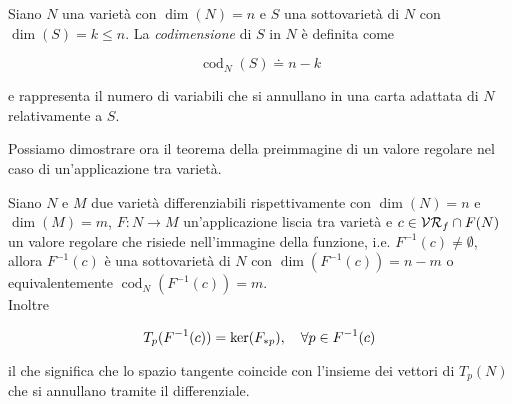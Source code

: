 \begin{definition}
	Siano $ N $ una varietà con $ \dim(N)=n $ e $ S $ una sottovarietà di $ N $ con $ \dim(S)=k \leqslant n $. La \textit{codimensione} di $ S $ in $ N $ è definita come
	
	\begin{equation}
		\operatorname{cod}_{N}(S) \doteq n-k
	\end{equation}

	e rappresenta il numero di variabili che si annullano in una carta adattata di $ N $ relativamente a $ S $.
\end{definition}

Possiamo dimostrare ora il teorema della preimmagine di un valore regolare nel caso di un'applicazione tra varietà.

\begin{theorem}\label{thm:preimg}
	Siano $ N $ e $ M $ due varietà differenziabili rispettivamente con $ \dim(N)=n $ e $ \dim(M)=m $, $ F : N \to M $ un'applicazione liscia tra varietà e $ c \in \mathcal{VR}_{f} \cap F(N) $ un valore regolare che risiede nell'immagine della funzione, i.e. $ F^{-1}(c) \neq \emptyset $, allora $ F^{-1}(c) $ è una sottovarietà di $ N $ con $ \dim(F^{-1}(c)) = n-m $ o equivalentemente $ \operatorname{cod}_{N}(F^{-1}(c)) = m $.\\
	Inoltre
	
	\begin{equation}
		T_{p}(F^{-1}(c)) = \ker(F_{*p}) \qcomma \forall p \in F^{-1}(c)
	\end{equation} 

	il che significa che lo spazio tangente coincide con l'insieme dei vettori di $ T_{p}(N) $ che si annullano tramite il differenziale.
\end{theorem}

